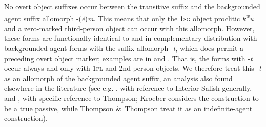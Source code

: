 \documentclass[output=paper,colorlinks,citecolor=brown]{langscibook}
\begin{document}
\begin{sloppypar}
No overt object suffixes occur between the transitive suffix and the
backgrounded agent suffix allomorph -(\emph{\'e})\emph{m}.  This means
that only the \textsc{1sg} object proclitic \emph{{k\textsuperscript w}u} and a
zero-marked third-person object can occur with this allomorph.
However, these forms are functionally identical to and in
complementary distribution with backgrounded agent forms with the
suffix allomorph -\emph{t}, which does permit a preceding overt object
marker; examples are in  and .  That is, the forms with -\emph{t}
occur always and only with \textsc{1pl} and 2nd-person objects.  We therefore
treat this -\emph{t} as an allomorph of the backgrounded agent suffix,
an analysis also found elsewhere in the literature (see
e.g. \citealt[25--28]{Kroeber:1999}, with reference to Interior
Salish generally, and \citealt[63]{Thompson&Thompson:1992}, with specific
reference to Thompson; Kroeber considers the construction to be a true
passive, while Thompson \&\ Thompson treat it as an indefinite-agent
construction).
\end{sloppypar}
\end{document}
